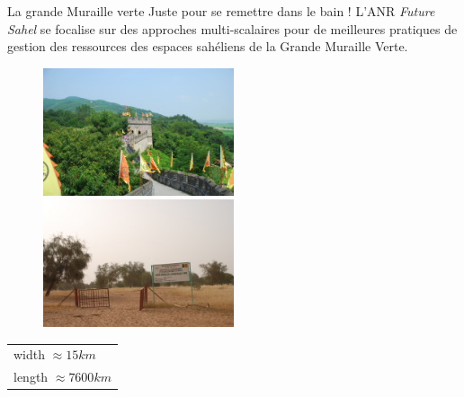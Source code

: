 \documentclass[newPxFont]{beamer}
\newcommand{\tabitem}{%
  \usebeamertemplate{itemize item}\hspace*{\labelsep}}
\begin{document}
\begin{frame}[c]{La grande Muraille verte}
\vspace{-1cm}
Juste pour se remettre dans le bain ! L'ANR \textit{Future Sahel} se focalise sur des  approches multi-scalaires pour de meilleures pratiques de gestion des ressources des espaces sahéliens de la Grande Muraille Verte.
\begin{figure}
	\centering
	\includegraphics[width = 0.5\textwidth]{img/great_wall}
  \includegraphics[width = 0.5\textwidth]{img/GMV_widou}
\end{figure}
\begin{center}
    \begin{tabular}{@{}l@{}}
       \\
      \tabitem width $\approx 15 km$ \\
      \tabitem length $\approx 7600km$
  \end{tabular}
\end{center}
\end{frame}
\end{document}
